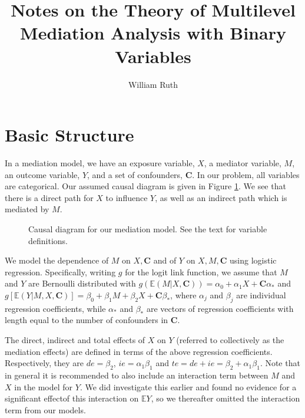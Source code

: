 \documentclass{article}
\title{Notes on the Theory of Multilevel Mediation Analysis with Binary Variables}
\author{William Ruth}
\date{}
\newcommand{\bE}{\mathbb{E}}
\newcommand{\C}{\mathbf{C}}
\begin{document}
\maketitle

\section{Basic Structure}
\label{sec:basics}

In a mediation model, we have an exposure variable, $X$, a mediator variable, $M$, an outcome variable, $Y$, and a set of confounders, $\mathbf{C}$. In our problem, all variables are categorical. Our assumed causal diagram is given in Figure \ref{fig:causal_diagram}. We see that there is a direct path for $X$ to influence $Y$, as well as an indirect path which is mediated by $M$.

\begin{figure}[t]
    \centering
    \caption{Causal diagram for our mediation model. See the text for variable definitions.}
    \label{fig:causal_diagram}
\end{figure}%

We model the dependence of $M$ on $X, \mathbf{C}$ and of $Y$ on $X, M, \mathbf{C}$ using logistic regression. Specifically, writing $g$ for the logit link function, we assume that $M$ and $Y$ are Bernoulli distributed with $g(\bE(M | X, \C)) = \alpha_0 + \alpha_1 X + \C \alpha_*$ and $g[\bE(Y | M, X, \C)] = \beta_0 + \beta_1 M + \beta_2 X + \C \beta_*$, where $\alpha_j$ and $\beta_j$ are individual regression coefficients, while $\alpha_*$ and $\beta_*$ are vectors of regression coefficients with length equal to the number of confounders in $\C$. 

The direct, indirect and total effects of $X$ on $Y$ (referred to collectively as the mediation effects) are defined in terms of the above regression coefficients. Respectively, they are $de = \beta_2$, $ie = \alpha_1 \beta_1$ and $te = de + ie = \beta_2 + \alpha_1 \beta_1$. Note that in general it is recommended to also include an interaction term between $M$ and $X$ in the model for $Y$. We did investigate this earlier and found no evidence for a significant effect\footnotemark of this interaction on $\bE Y$, so we thereafter omitted the interaction term from our models.
\end{document}
